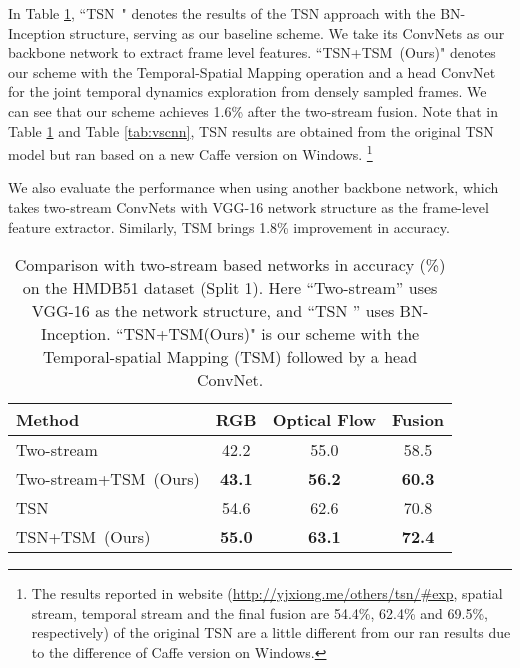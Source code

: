 \documentclass[english, 10pt, twocolumn, twoside]{IEEEtran}
\begin{document}
In Table \ref{tab:twostream}, ``TSN~\cite{wang2016temporal}" denotes the results of the TSN approach \cite{wang2016temporal} with the BN-Inception structure, serving as our baseline scheme. We take its ConvNets as our backbone network to extract frame level features. ``TSN+TSM~(Ours)" denotes our scheme with the Temporal-Spatial Mapping operation and a head ConvNet for the joint temporal dynamics exploration from densely sampled frames. We can see that our scheme achieves 1.6\% after the two-stream fusion. Note that in Table \ref{tab:twostream} and Table \ref{tab:vscnn}, TSN results are obtained from the original TSN model but ran based on a new Caffe version on Windows. \footnote{The results reported in website (\url{http://yjxiong.me/others/tsn/\#exp}, spatial stream, temporal stream and the final fusion are 54.4\%, 62.4\% and 69.5\%, respectively) of the original TSN are a little different from our ran results due to the difference of Caffe version on Windows. }

We also evaluate the performance when using another backbone network, which takes two-stream ConvNets with VGG-16 network structure \cite{feichtenhofer2016convolutional} as the frame-level feature extractor. Similarly, TSM brings 1.8\% improvement in accuracy.

\begin{table}[t]
 \caption{Comparison with two-stream based networks in accuracy (\%) on the HMDB51 dataset (Split 1). Here ``Two-stream'' \cite{simonyan2014two} uses VGG-16 as the network structure, and ``TSN \cite{wang2016temporal}'' uses BN-Inception. ``TSN+TSM(Ours)" is our scheme with the Temporal-spatial Mapping (TSM) followed by a head ConvNet.}
\label{tab:twostream}
 \begin{center}
   \fontsize{9pt}{10pt}\selectfont\centering
   \begin{tabular}{|l|c|c|c|}
     \hline
     Method & RGB & Optical Flow & Fusion \\
     \hline\hline
     Two-stream \cite{feichtenhofer2016convolutional} & 42.2 & 55.0 & 58.5 \\
     Two-stream+TSM~(Ours) & \textbf{43.1} & \textbf{56.2} & \textbf{60.3} \\
     \hline
TSN \cite{wang2016temporal} & 54.6 & 62.6 & 70.8 \\
     TSN+TSM~(Ours) & \textbf{55.0} & \textbf{63.1} & \textbf{72.4} \\
     \hline
   \end{tabular}
 \end{center}
\vspace{-4mm}
\end{table}
\end{document}
